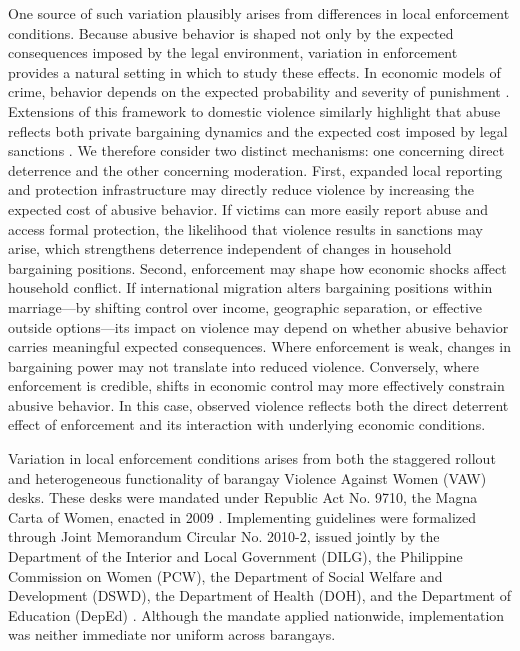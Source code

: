 \documentclass[12pt]{article}
\begin{document}
One source of such variation  plausibly arises from differences in local enforcement conditions. Because abusive behavior is shaped not only by the expected consequences imposed by the legal environment, variation in enforcement provides a natural setting in which to study these effects. In economic models of crime, behavior depends on the expected probability and severity of punishment \citep{becker1968crime}. Extensions of this framework to domestic violence similarly highlight that abuse reflects both private bargaining dynamics and the expected cost imposed by legal sanctions \citep{aizer2010gender, iyengar2009does}. We therefore consider two distinct mechanisms: one concerning direct deterrence and the other concerning moderation. First, expanded local reporting and protection infrastructure may directly reduce violence by increasing the expected cost of abusive behavior. If victims can more easily report abuse and access formal protection, the likelihood that violence results in sanctions may arise, which strengthens deterrence independent of changes in household bargaining positions. Second, enforcement may shape how economic shocks affect household conflict. If international migration alters bargaining positions within marriage—by shifting control over income, geographic separation, or effective outside options—its impact on violence may depend on whether abusive behavior carries meaningful expected consequences. Where enforcement is weak, changes in bargaining power may not translate into reduced violence. Conversely, where enforcement is credible, shifts in economic control may more effectively constrain abusive behavior. In this case, observed violence reflects both the direct deterrent effect of enforcement and its interaction with underlying economic conditions.

Variation in local enforcement conditions arises from both the staggered rollout and heterogeneous functionality of barangay Violence Against Women (VAW) desks. These desks were mandated under Republic Act No. 9710, the Magna Carta of Women, enacted in 2009 \citep{ra9710}. Implementing guidelines were formalized through Joint Memorandum Circular No. 2010-2, issued jointly by the Department of the Interior and Local Government (DILG), the Philippine Commission on Women (PCW), the Department of Social Welfare and Development (DSWD), the Department of Health (DOH), and the Department of Education (DepEd) \citep{jmc2010}. Although the mandate applied nationwide, implementation was neither immediate nor uniform across barangays.
\end{document}
